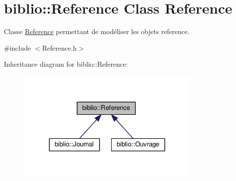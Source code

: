 \hypertarget{classbiblio_1_1Reference}{}\section{biblio\+:\+:Reference Class Reference}
\label{classbiblio_1_1Reference}


Classe \hyperlink{classbiblio_1_1Reference}{Reference} permettant de modéliser les objets reference.  




{\ttfamily \#include $<$Reference.\+h$>$}



Inheritance diagram for biblio\+:\+:Reference\+:\nopagebreak
\begin{figure}[H]
\begin{center}
\leavevmode
\includegraphics[width=257pt]{classbiblio_1_1Reference__inherit__graph}
\end{center}
\end{figure}
